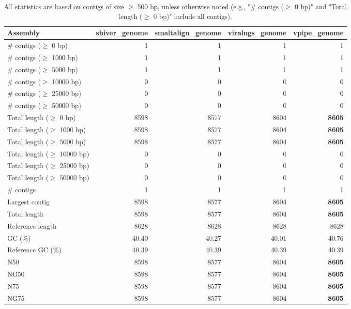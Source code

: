 \documentclass[12pt,a4paper]{article}
\begin{document}
\begin{table}[ht]
\begin{center}
\caption{All statistics are based on contigs of size $\geq$ 500 bp, unless otherwise noted (e.g., "\# contigs ($\geq$ 0 bp)" and "Total length ($\geq$ 0 bp)" include all contigs).}
\begin{tabular}{|l*{4}{|r}|}
\hline
Assembly & shiver\_genome & smaltalign\_genome & viralngs\_genome & vpipe\_genome \\ \hline
\# contigs ($\geq$ 0 bp) & 1 & 1 & 1 & 1 \\ \hline
\# contigs ($\geq$ 1000 bp) & 1 & 1 & 1 & 1 \\ \hline
\# contigs ($\geq$ 5000 bp) & 1 & 1 & 1 & 1 \\ \hline
\# contigs ($\geq$ 10000 bp) & 0 & 0 & 0 & 0 \\ \hline
\# contigs ($\geq$ 25000 bp) & 0 & 0 & 0 & 0 \\ \hline
\# contigs ($\geq$ 50000 bp) & 0 & 0 & 0 & 0 \\ \hline
Total length ($\geq$ 0 bp) & 8598 & 8577 & 8604 & {\bf 8605} \\ \hline
Total length ($\geq$ 1000 bp) & 8598 & 8577 & 8604 & {\bf 8605} \\ \hline
Total length ($\geq$ 5000 bp) & 8598 & 8577 & 8604 & {\bf 8605} \\ \hline
Total length ($\geq$ 10000 bp) & 0 & 0 & 0 & 0 \\ \hline
Total length ($\geq$ 25000 bp) & 0 & 0 & 0 & 0 \\ \hline
Total length ($\geq$ 50000 bp) & 0 & 0 & 0 & 0 \\ \hline
\# contigs & 1 & 1 & 1 & 1 \\ \hline
Largest contig & 8598 & 8577 & 8604 & {\bf 8605} \\ \hline
Total length & 8598 & 8577 & 8604 & {\bf 8605} \\ \hline
Reference length & 8628 & 8628 & 8628 & 8628 \\ \hline
GC (\%) & 40.40 & 40.27 & 40.01 & 40.76 \\ \hline
Reference GC (\%) & 40.39 & 40.39 & 40.39 & 40.39 \\ \hline
N50 & 8598 & 8577 & 8604 & {\bf 8605} \\ \hline
NG50 & 8598 & 8577 & 8604 & {\bf 8605} \\ \hline
N75 & 8598 & 8577 & 8604 & {\bf 8605} \\ \hline
NG75 & 8598 & 8577 & 8604 & {\bf 8605} \\ \hline

\end{tabular}
\end{center}
\end{table}
\end{document}

